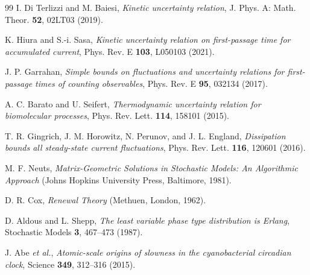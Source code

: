 \documentclass[11pt,onecolumn]{article}
\theoremstyle{definition}
\begin{document}
\begin{thebibliography}{99}
 I. Di Terlizzi and M. Baiesi, \emph{Kinetic uncertainty relation}, J. Phys. A: Math. Theor. \textbf{52}, 02LT03 (2019).

 K. Hiura and S.-i. Sasa, \emph{Kinetic uncertainty relation on first-passage time for accumulated current}, Phys. Rev. E \textbf{103}, L050103 (2021).

 J. P. Garrahan, \emph{Simple bounds on fluctuations and uncertainty relations for first-passage times of counting observables}, Phys. Rev. E \textbf{95}, 032134 (2017).

 A. C. Barato and U. Seifert, \emph{Thermodynamic uncertainty relation for biomolecular processes}, Phys. Rev. Lett. \textbf{114}, 158101 (2015).

 T. R. Gingrich, J. M. Horowitz, N. Perunov, and J. L. England, \emph{Dissipation bounds all steady-state current fluctuations}, Phys. Rev. Lett. \textbf{116}, 120601 (2016).

 M. F. Neuts, \emph{Matrix-Geometric Solutions in Stochastic Models: An Algorithmic Approach} (Johns Hopkins University Press, Baltimore, 1981).

 D. R. Cox, \emph{Renewal Theory} (Methuen, London, 1962).

 D. Aldous and L. Shepp, \emph{The least variable phase type distribution is Erlang}, Stochastic Models \textbf{3}, 467--473 (1987).

 J. Abe \emph{et al.}, \emph{Atomic-scale origins of slowness in the cyanobacterial circadian clock}, Science \textbf{349}, 312--316 (2015).

\end{thebibliography}
\end{document}
